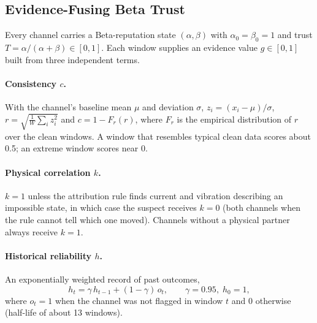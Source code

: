 \documentclass[11pt,a4paper]{article}
\begin{document}
\subsection{Evidence-Fusing Beta Trust}
\label{sec:trust}

Every channel carries a Beta-reputation state \cite{josang2002beta} $(\alpha, \beta)$ with $\alpha_0 = \beta_0 = 1$ and trust $T = \alpha/(\alpha+\beta) \in [0,1]$. Each window supplies an evidence value $g \in [0,1]$ built from three independent terms.

\paragraph{Consistency $c$.} With the channel's baseline mean $\mu$ and deviation $\sigma$, $z_i = (x_i - \mu)/\sigma$, $r = \sqrt{\tfrac{1}{W}\sum_i z_i^2}$ and $c = 1 - F_r(r)$, where $F_r$ is the empirical distribution of $r$ over the clean windows. A window that resembles typical clean data scores about 0.5; an extreme window scores near 0.

\paragraph{Physical correlation $k$.} $k = 1$ unless the attribution rule finds current and vibration describing an impossible state, in which case the suspect receives $k = 0$ (both channels when the rule cannot tell which one moved). Channels without a physical partner always receive $k = 1$.

\paragraph{Historical reliability $h$.} An exponentially weighted record of past outcomes,
\begin{equation}
h_t = \gamma\, h_{t-1} + (1-\gamma)\, o_t, \qquad \gamma = 0.95,\; h_0 = 1,
\end{equation}
where $o_t = 1$ when the channel was not flagged in window $t$ and $0$ otherwise (half-life of about 13 windows).
\end{document}
